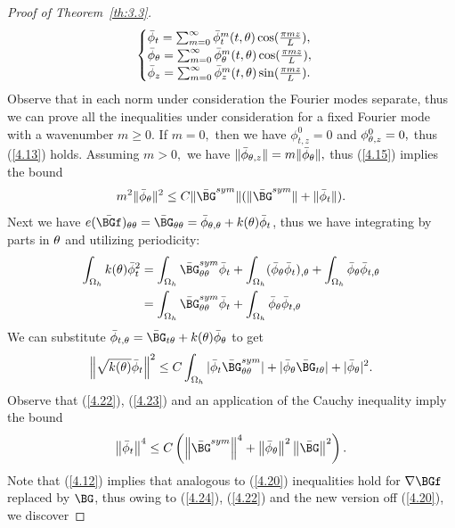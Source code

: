\begin{proof}[Proof of Theorem~{\ref{th:3.3}}]
\begin{equation}
\label{4.21}
\begin{cases}
\bar \phi_t=\sum_{m=0}^\infty \bar \phi_t^m(t,\theta)\cos(\frac{\pi mz}{L}),\\
\bar \phi_\theta=\sum_{m=0}^\infty \bar \phi_\theta^m(t,\theta)\cos(\frac{\pi mz}{L}),\\
\bar \phi_z=\sum_{m=0}^\infty \bar \phi_z^m(t,\theta)\sin(\frac{\pi mz}{L}).
\end{cases}
\end{equation}
Observe that in each norm under consideration the Fourier modes separate, thus we can prove all the inequalities under consideration for a fixed Fourier mode with a
wavenumber $m \geq 0.$ If $m=0,$ then we have $\phi_{t,z}^0=0$ and $\phi_{\theta,z}^0=0,$ thus (\ref{4.13}) holds. Assuming $m>0,$ we have $\|\bar \phi_{\theta,z}\|=m\|\bar\phi_{\theta}\|,$
thus (\ref{4.15}) implies the bound 
\begin{equation}
\label{4.22}
m^2\|\bar\phi_{\Gth}\|^2\leq C\|\bar \BG^{sym}\|(\|\bar \BG^{sym}\|+\|\bar \phi_t\|).
\end{equation}
Next we have $e(\bar \BGf)_{\theta\theta}=\bar\BG_{\Gth\Gth}=\bar\phi_{\theta,\theta}+k(\theta)\bar\phi_t$, thus we have integrating by parts in $\theta$ and utilizing periodicity: 
\begin{align*}
\int_{\Omega_h} k(\theta) \bar\phi_t^2&= \int_{\Omega_h} \bar\BG^{sym}_{\theta\theta} \bar\phi_t+\int_{\Omega_h}  (\bar\phi_\theta \bar\phi_t)_{,\theta}
+\int_{\Omega_h} \bar\phi_\theta \bar\phi_{t,\theta}\\
&=\int_{\Omega_h} \bar\BG^{sym}_{\theta\theta} \bar\phi_t+\int_{\Omega_h} \bar\phi_\theta \bar\phi_{t,\theta}\\
\end{align*}
We can substitute $\bar\phi_{t,\theta}=\bar\BG_{t\theta}+k(\theta)\bar\phi_\theta$ to get
\begin{equation}
\label{4.23}
\norm{\sqrt{k(\theta)}\bar\phi_t}^2\leq C\int_{\Omega_h} |\bar\phi_t \bar\BG^{sym}_{\theta\theta}|+|\bar\phi_\theta \bar\BG_{t\theta}|+|\bar\phi_\theta|^2.
\end{equation}
Observe that (\ref{4.22}), (\ref{4.23}) and an application of the Cauchy inequality imply the bound
\begin{equation}
\label{4.24}
\norm{\bar\phi_t}^4 \leq C\left(\norm{\bar\BG^{sym}}^4+\norm{\bar\phi_\theta}^2\norm{\bar\BG}^2\right).
\end{equation}
Note that (\ref{4.12}) implies that analogous to (\ref{4.20}) inequalities hold for $\nabla\BGf$ replaced by $\BG$, thus owing to (\ref{4.24}), (\ref{4.22}) and the new version off (\ref{4.20}), we discover 

\end{proof}
